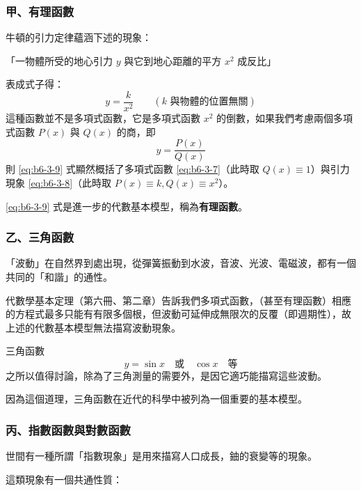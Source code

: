 \subsubsection*{甲、有理函數}\label{subsec:b6-3-2-a}

牛頓的引力定律蘊涵下述的現象：

「一物體所受的地心引力 $y$ 與它到地心距離的平方 $x^2$ 成反比」

表成式子得：
\begin{equation}
y = \dfrac{k}{x^2} \qquad (k \text{ 與物體的位置無關}) \label{eq:b6-3-8}
\end{equation}
這種函數並不是多項式函數，它是多項式函數 $x^2$ 的倒數，如果我們考慮兩個多項式函數 $P(x)$ 與 $Q(x)$ 的商，即
\begin{equation}
y = \dfrac{P(x)}{Q(x)} \label{eq:b6-3-9}
\end{equation}
則 \eqref{eq:b6-3-9} 式顯然概括了多項式函數 \eqref{eq:b6-3-7}（此時取 $Q(x)\equiv 1$）與引力現象 \eqref{eq:b6-3-8}（此時取 $P(x)\equiv k, Q(x)\equiv x^2$）。

\eqref{eq:b6-3-9} 式是進一步的代數基本模型，稱為\textbf{有理函數}。

\subsubsection*{乙、三角函數}\label{subsec:b6-3-2-b}

「波動」在自然界到處出現，從彈簧振動到水波，音波、光波、電磁波，都有一個共同的「和諧」的通性。

代數學基本定理（第六冊、第二章）告訴我們多項式函數，（甚至有理函數）相應的方程式最多只能有有限多個根，但波動可延伸成無限次的反覆（即週期性），故上述的代數基本模型無法描寫波動現象。

三角函數
\begin{equation}
y = \sin x \quad \text{或} \quad \cos x \quad \text{等} \label{eq:b6-3-10}
\end{equation}
之所以值得討論，除為了三角測量的需要外，是因它適巧能描寫這些波動。

因為這個道理，三角函數在近代的科學中被列為一個重要的基本模型。

\subsubsection*{丙、指數函數與對數函數}\label{subsec:b6-3-2-c}

世間有一種所謂「指數現象」是用來描寫人口成長，鈾的衰變等的現象。

這類現象有一個共通性質：

